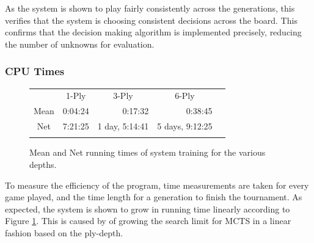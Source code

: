 \documentclass[12pt,a4paper]{article}
\begin{document}
            As the system is shown to play fairly consistently across the generations, this verifies that the system is choosing consistent decisions across the board. This confirms that the decision making algorithm is implemented precisely, reducing the number of unknowns for evaluation.

        \subsubsection{CPU Times}

        \begin{figure}[!ht]
            \centering
    
                \begin{tabular}{ccccc}
                       & 1-Ply        & 3-Ply          & 6-Ply          & \\ \cline{2-4}
                \multicolumn{1}{c|}{Mean} & \multicolumn{1}{r|}{0:04:24} & \multicolumn{1}{r|}{0:17:32}  & \multicolumn{1}{r|}{0:38:45}   & \\ \cline{2-4}
                \multicolumn{1}{c|}{Net} & \multicolumn{1}{r|}{7:21:25} & \multicolumn{1}{r|}{1 day, 5:14:41} & \multicolumn{1}{r|}{5 days, 9:12:25} & \\ \cline{2-4}
                       &          &           &            & 
                \end{tabular}
    
            \caption{Mean and Net running times of system training for the various depths. \label{cpu_table}}
            \end{figure}


            To measure the efficiency of the program, time measurements are taken for every game played, and the time length for a generation to finish the tournament. As expected, the system is shown to grow in running time linearly according to Figure \ref{cpu_table}. This is caused by of growing the search limit for MCTS in a linear fashion based on the ply-depth.
\end{document}
